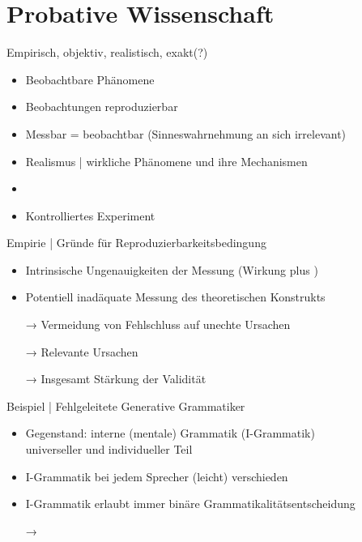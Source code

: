 
\section{Probative Wissenschaft}

\begin{frame}
  {Empirisch, objektiv, realistisch, exakt(?)}
  \begin{itemize}[<+->]
    \item \alert{Beobachtbare} Phänomene
    \item Beobachtungen \alert{reproduzierbar}
    \item Messbar = beobachtbar (Sinneswahrnehmung an sich irrelevant)
      \Zeile
    \item \alert{Realismus} | wirkliche Phänomene und ihre Mechanismen
    \item {}
      \Zeile
    \item \alert{Kontrolliertes Experiment}
  \end{itemize}
\end{frame}

\begin{frame}
  {Empirie | Gründe für Reproduzierbarkeitsbedingung}
  \begin{itemize}[<+->]
    \item Intrinsische Ungenauigkeiten der Messung (\alert{Wirkung} plus )
    \item Potentiell inadäquate Messung des theoretischen Konstrukts
      \Halbzeile
    \item[→] Vermeidung von Fehlschluss auf unechte Ursachen
    \item[→] \alert{Relevante Ursachen}
      \Halbzeile
    \item[→] Insgesamt \alert{Stärkung der Validität}
  \end{itemize}
\end{frame}

\begin{frame}
  {Beispiel | Fehlgeleitete Generative Grammatiker}
  \begin{itemize}[<+->]
    \item Gegenstand: interne (mentale) Grammatik (I-Grammatik)\\
      universeller und individueller Teil
    \item I-Grammatik bei jedem Sprecher (leicht) verschieden
    \item I-Grammatik erlaubt immer binäre Grammatikalitätsentscheidung
      \Halbzeile
    \item[→] 
  \end{itemize}
  \Zeile
  \onslide<+->
  \centering 
\end{frame}


